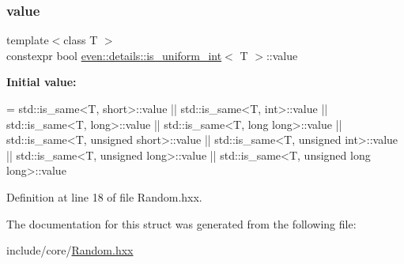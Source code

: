 \subsubsection{\texorpdfstring{value}{value}}
{\footnotesize\ttfamily template$<$class T $>$ \\
constexpr bool \mbox{\hyperlink{structeven_1_1details_1_1is__uniform__int}{even\+::details\+::is\+\_\+uniform\+\_\+int}}$<$ T $>$\+::value\hspace{0.3cm}{\ttfamily [static]}}

{\bfseries Initial value\+:}
\begin{DoxyCode}
=
                std::is\_same<T,              short>::value ||
        std::is\_same<T, int>::value ||
        std::is\_same<T, long>::value ||
        std::is\_same<T, long long>::value ||
        std::is\_same<T, unsigned short>::value ||
        std::is\_same<T, unsigned int>::value ||
        std::is\_same<T, unsigned long>::value ||
        std::is\_same<T, unsigned long long>::value
\end{DoxyCode}


Definition at line 18 of file Random.\+hxx.



The documentation for this struct was generated from the following file\+:\begin{DoxyCompactItemize}
\item 
include/core/\mbox{\hyperlink{_random_8hxx}{Random.\+hxx}}\end{DoxyCompactItemize}
